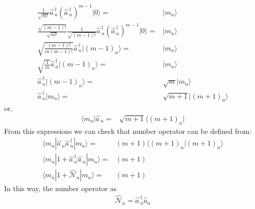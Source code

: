 \begin{align}
\frac{1}{\sqrt{m!}} \widehat{a\,}_{n}^\dagger\left(\widehat{a\,}_{n}^\dagger\right)^{m-1} |0\rangle=&|m_n\rangle\nonumber\\
\frac{\sqrt{(m-1)!}}{\sqrt{m!}}\frac{1}{\sqrt{(m-1)!}} \widehat{a\,}_{n}^\dagger\left(\widehat{a\,}_{n}^\dagger\right)^{m-1} |0\rangle=&|m_n\rangle\nonumber\\
\sqrt{\frac{(m-1)!}{m(m-1)!}} \widehat{a\,}_{n}^\dagger|(m-1)_n\rangle=&|m_n\rangle\nonumber\\
\sqrt{\frac{1}{m}} \widehat{a\,}_{n}^\dagger|(m-1)_n\rangle=&|m_n\rangle\nonumber\\
 \widehat{a\,}_{n}^\dagger|(m-1)_n\rangle=&\sqrt{m}|m_n\rangle\nonumber\\
 \widehat{a\,}_{n}^\dagger|m_n\rangle=&\sqrt{m+1}|(m+1)_n\rangle
\end{align}
or,
\begin{align}
  \langle m_n|\widehat{a\,}_{n}=&\sqrt{m+1}\langle(m+1)_n|
\end{align}
From this expressions we can check that number operator can be defined from:
\begin{align}
 \langle m_n|\widehat{a\,}_{n}  \widehat{a\,}_{n}^\dagger|m_n\rangle=&(m+1)\langle(m+1)_n|(m+1)_n\rangle\nonumber\\
 \langle m_n|1+\widehat{a\,}_{n}^\dagger\widehat{a\,}_{n} |m_n\rangle=&(m+1)\nonumber\\
 \langle m_n|1+\widehat{\mathcal{N}}_n |m_n\rangle=&(m+1)
\end{align}
In this way, the number operator as
\begin{align}
  \widehat{\mathcal{N}}_n=\widehat{a\,}_{n}^\dagger\widehat{a}_{n}
\end{align}



